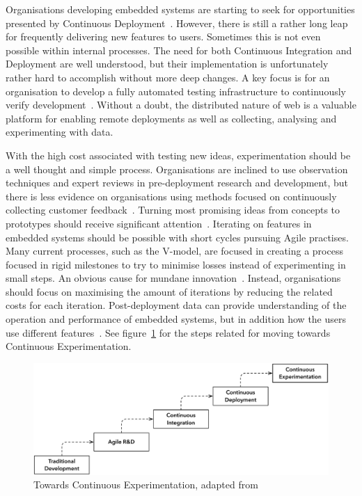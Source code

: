 \documentclass[english]{tktltiki2}
\begin{document}
Organisations developing embedded systems are starting to seek for opportunities presented by Continuous Deployment~\cite{HAB12}. However, there is still a rather long leap for frequently delivering new features to users. Sometimes this is not even possible within internal processes. The need for both Continuous Integration and Deployment are well understood, but their implementation is unfortunately rather hard to accomplish without more deep changes. A key focus is for an organisation to develop a fully automated testing infrastructure to continuously verify development~\cite{HAB12}. Without a doubt, the distributed nature of web is a valuable platform for enabling remote deployments as well as collecting, analysing and experimenting with data.

With the high cost associated with testing new ideas, experimentation should be a well thought and simple process. Organisations are inclined to use observation techniques and expert reviews in pre-deployment research and development, but there is less evidence on organisations using methods focused on continuously collecting customer feedback~\cite{HB14}. Turning most promising ideas from concepts to prototypes should receive significant attention~\cite{BE12}. Iterating on features in embedded systems should be possible with short cycles pursuing Agile practises. Many current processes, such as the V-model, are focused in creating a process focused in rigid milestones to try to minimise losses instead of experimenting in small steps. An obvious cause for mundane innovation~\cite{BE12}. Instead, organisations should focus on maximising the amount of iterations by reducing the related costs for each iteration. Post-deployment data can provide understanding of the operation and performance of embedded systems, but in addition how the users use different features~\cite{BE12, HB14}. See figure~\ref{figure:towards-continuous-experimentation} for the steps related for moving towards Continuous Experimentation.

\begin{figure}[h!]

    \centering

    \includegraphics[width = \textwidth]{figures/towards-continuous-experimentation}

    \caption{Towards Continuous Experimentation, adapted from~\cite{HAB12}}
    \label{figure:towards-continuous-experimentation}

    \vspace{1cm}

\end{figure}
\end{document}
